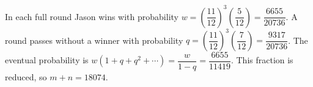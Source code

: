In each full round Jason wins with probability $w=(\dfrac{11}{12})^3(\dfrac{5}{12})=\dfrac{6655}{20736}$. A round passes without a winner with probability $q=(\dfrac{11}{12})^3(\dfrac{7}{12})=\dfrac{9317}{20736}$. The eventual probability is $w(1+q+q^2+\cdots)=\dfrac{w}{1-q}=\dfrac{6655}{11419}$. This fraction is reduced, so $\boxed{m+n=18074}$.
